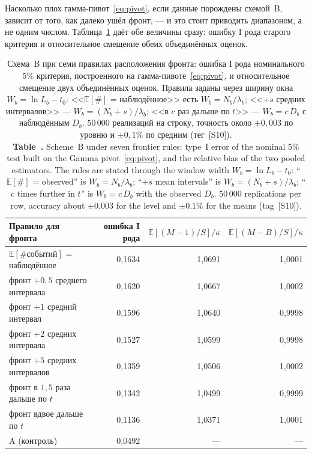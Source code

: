 \documentclass[11pt,a4paper]{article}
\newcommand{\encaptab}[1]{\\[3pt]\foreignlanguage{english}{%
  \textbf{Table~\thetable.} #1}}
\theoremstyle{plain}
\theoremstyle{remark}
\begin{document}
Насколько плох гамма-пивот~\eqref{eq:pivot}, если данные порождены схемой~B,
зависит от того, как далеко ушёл фронт, --- и это стоит приводить диапазоном, а
не одним числом. Таблица~\ref{tab:calib} даёт обе величины сразу: ошибку I рода
старого критерия и относительное смещение обеих объединённых оценок.

\begin{table}[t]
\centering
\caption{Схема~B при семи правилах расположения фронта: ошибка I рода
номинального $5\%$ критерия, построенного на гамма-пивоте~\eqref{eq:pivot}, и
относительное смещение двух объединённых оценок. Правила заданы через ширину окна
$W_b=\ln L_b-t_0$: <<$\mathbb E[\#]$ = наблюдённое>> есть $W_b=N_b/\lambda_b$;
<<$+s$ средних интервалов>> --- $W_b=(N_b+s)/\lambda_b$; <<в $c$ раз дальше по $t$>>
--- $W_b=c\,D_b$ с наблюдённым $D_b$. $50\,000$ реализаций на строку, точность
около $\pm0{,}003$ по уровню и $\pm0{,}1\%$ по средним (тег~[S10]).
\encaptab{Scheme~B under seven frontier rules: type~I error of the nominal $5\%$
test built on the Gamma pivot~\eqref{eq:pivot}, and the relative bias of the two
pooled estimators. The rules are stated through the window width
$W_b=\ln L_b-t_0$: ``$\mathbb E[\#]$ = observed'' is $W_b=N_b/\lambda_b$;
``$+s$ mean intervals'' is $W_b=(N_b+s)/\lambda_b$; ``$c$ times further in $t$''
is $W_b=c\,D_b$ with the observed $D_b$. $50\,000$ replications per row, accuracy
about $\pm0.003$ for the level and $\pm0.1\%$ for the means (tag~[S10]).}}
\label{tab:calib}
\small
\begin{tabular}{lrrr}
\toprule
Правило для фронта & ошибка I рода & $\mathbb E[(M{-}1)/S]/\kappa$
& $\mathbb E[(M{-}B)/S]/\kappa$\\
\midrule
$\mathbb E[\#\text{событий}]$ = наблюдённое & 0{,}1634 & 1{,}0691 & 1{,}0001\\
фронт $+0{,}5$ среднего интервала & 0{,}1620 & 1{,}0667 & 1{,}0002\\
фронт $+1$ средний интервал & 0{,}1596 & 1{,}0640 & 0{,}9998\\
фронт $+2$ средних интервала & 0{,}1527 & 1{,}0599 & 0{,}9998\\
фронт $+5$ средних интервалов & 0{,}1359 & 1{,}0506 & 1{,}0002\\
фронт в $1{,}5$ раза дальше по $t$ & 0{,}1342 & 1{,}0499 & 0{,}9999\\
фронт вдвое дальше по $t$ & 0{,}1136 & 1{,}0371 & 1{,}0001\\
\midrule
A (контроль) & 0{,}0492 & --- & ---\\
\bottomrule
\end{tabular}
\end{table}
\end{document}
